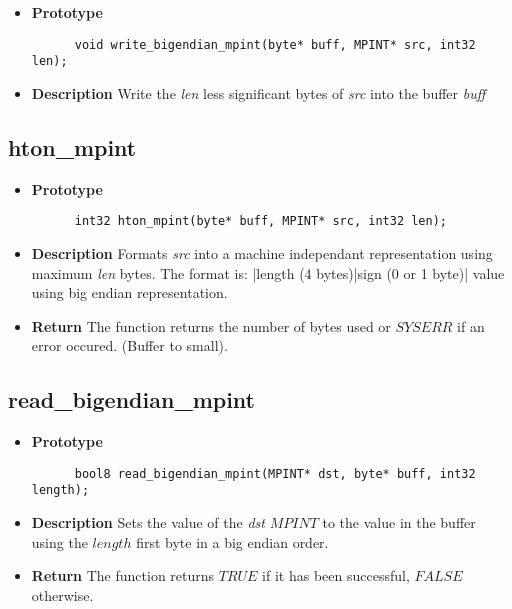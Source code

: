 \documentclass[10pt,a4paper]{article}
\begin{document}
  \begin{itemize}
    \item [] \textbf{Prototype}
    \begin{lstlisting}
      void write_bigendian_mpint(byte* buff, MPINT* src, int32 len);
    \end{lstlisting}
    \item [] \textbf{Description} Write the \textit{len} less significant bytes of \textit{src} into the buffer \textit{buff}
  \end{itemize}
  
  \subsection{hton\_mpint}
  
  \begin{itemize}
    \item [] \textbf{Prototype}
    \begin{lstlisting}
      int32 hton_mpint(byte* buff, MPINT* src, int32 len);
    \end{lstlisting}
    \item [] \textbf{Description} Formats \textit{src} into a machine independant representation using maximum \textit{len} bytes. The format is: |length (4 bytes)|sign (0 or 1 byte)| value using
    big endian representation.
    \item [] \textbf{Return} The function returns the number of bytes used or $SYSERR$ if an error occured. (Buffer to small).
  \end{itemize}
  
  \subsection{read\_bigendian\_mpint}
  
  \begin{itemize}
    \item [] \textbf{Prototype}
    \begin{lstlisting}
      bool8 read_bigendian_mpint(MPINT* dst, byte* buff, int32 length);
    \end{lstlisting}
    \item [] \textbf{Description} Sets the value of the \textit{dst} $MPINT$ to the value in the buffer using the $length$ first byte in a big endian order.
    \item [] \textbf{Return} The function returns $TRUE$ if it has been successful, $FALSE$ otherwise.
  \end{itemize}
  
\end{document}
